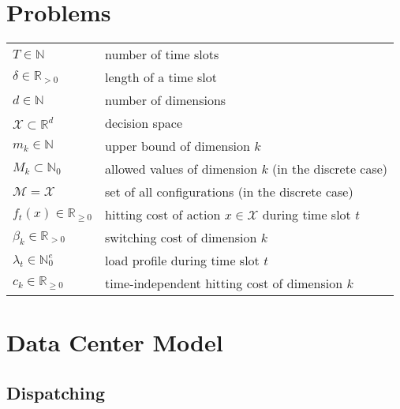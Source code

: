 \label{chapter:notation}

\section*{Problems}

\nopagebreak\begin{tabularx}{\textwidth}{p{100pt}X}
    $T \in \mathbb{N}$ & number of time slots \\
    $\delta \in \mathbb{R}_{>0}$ & length of a time slot \\
    $d \in \mathbb{N}$ & number of dimensions \\
    $\mathcal{X} \subset \mathbb{R}^d$ & decision space \\
    $m_k \in \mathbb{N}$ & upper bound of dimension $k$ \\
    $M_k \subset \mathbb{N}_0$ & allowed values of dimension $k$ (in the discrete case) \\
    $\mathcal{M} = \mathcal{X}$ & set of all configurations (in the discrete case) \\
    $f_t(x) \in \mathbb{R}_{\geq 0}$ & hitting cost of action $x \in \mathcal{X}$ during time slot $t$ \\
    $\beta_k \in \mathbb{R}_{>0}$ & switching cost of dimension $k$ \\
    $\lambda_t \in \mathbb{N}_0^e$ & load profile during time slot $t$ \\
    $c_k \in \mathbb{R}_{\geq 0}$ & time-independent hitting cost of dimension $k$ \\
\end{tabularx}

\section*{Data Center Model}

\subsection*{Dispatching}


